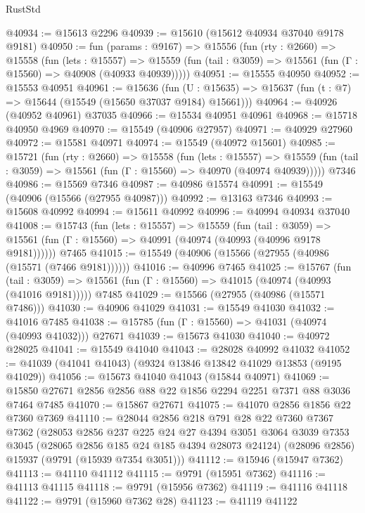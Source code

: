 \begin{lexlean}{RustStd}
\begin{coremodule}
@40934 := @15613 @2296
@40939 := @15610 (@15612 @40934 @37040 @9178 @9181)
@40950 := fun (params : @9167) =>
  @15556
    (fun (rty : @2660) =>
    @15558
      (fun (lets : @15557) =>
      @15559 (fun (tail : @3059) => @15561 (fun (Γ : @15560) => @40908 (@40933 @40939)))))
@40951 := @15555 @40950
@40952 := @15553 @40951
@40961 := @15636
    (fun (U : @15635) => @15637 (fun (t : @7) => @15644 (@15549 (@15650 @37037 @9184) @15661)))
@40964 := @40926 (@40952 @40961) @37035
@40966 := @15534 @40951 @40961
@40968 := @15718 @40950 @4969
@40970 := @15549 (@40906 @27957)
@40971 := @40929 @27960
@40972 := @15581 @40971
@40974 := @15549 (@40972 @15601)
@40985 := @15721
    (fun (rty : @2660) =>
    @15558
      (fun (lets : @15557) =>
      @15559 (fun (tail : @3059) => @15561 (fun (Γ : @15560) => @40970 (@40974 @40939)))))
    @7346
@40986 := @15569 @7346
@40987 := @40986 @15574
@40991 := @15549 (@40906 (@15566 (@27955 @40987)))
@40992 := @13163 @7346
@40993 := @15608 @40992
@40994 := @15611 @40992
@40996 := @40994 @40934 @37040
@41008 := @15743
    (fun (lets : @15557) =>
    @15559
      (fun (tail : @3059) =>
      @15561 (fun (Γ : @15560) => @40991 (@40974 (@40993 (@40996 @9178 @9181))))))
    @7465
@41015 := @15549 (@40906 (@15566 (@27955 (@40986 (@15571 (@7466 @9181))))))
@41016 := @40996 @7465
@41025 := @15767
    (fun (tail : @3059) => @15561 (fun (Γ : @15560) => @41015 (@40974 (@40993 (@41016 @9181)))))
    @7485
@41029 := @15566 (@27955 (@40986 (@15571 @7486)))
@41030 := @40906 @41029
@41031 := @15549 @41030
@41032 := @41016 @7485
@41038 := @15785 (fun (Γ : @15560) => @41031 (@40974 (@40993 @41032))) @27671
@41039 := @15673 @41030
@41040 := @40972 @28025
@41041 := @15549 @41040
@41043 := @28028 @40992 @41032
@41052 := @41039 (@41041 @41043) (@9324 @13846 @13842 @41029 @13853 (@9195 @41029))
@41056 := @15673 @41040 @41043 (@15844 @40971)
@41069 := @15850 @27671 @2856 @2856 @88 @22 @1856 @2294 @2251 @7371 @88 @3036 @7464 @7485
@41070 := @15867 @27671
@41075 := @41070 @2856 @1856 @22 @7360 @7369
@41110 := @28044
    @2856
    @218
    @791
    @28
    @22
    @7360
    @7367
    @7362
    (@28053
      @2856
      @237
      @225
      @24
      @27
      @4394
      @3051
      @3064
      @3039
      @7353
      @3045
      (@28065 @2856 @185 @24 @185 @4394 @28073 @24124)
      (@28096 @2856)
      @15937
      (@9791 (@15939 @7354 @3051)))
@41112 := @15946 (@15947 @7362)
@41113 := @41110 @41112
@41115 := @9791 (@15951 @7362)
@41116 := @41113 @41115
@41118 := @9791 (@15956 @7362)
@41119 := @41116 @41118
@41122 := @9791 (@15960 @7362 @28)
@41123 := @41119 @41122

\end{coremodule}
\end{lexlean}
